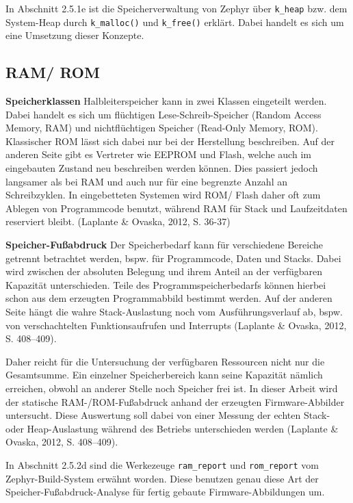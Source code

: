 In Abschnitt 2.5.1e ist die Speicherverwaltung von Zephyr {\"u}ber \lstinline[style=fileinline]|k_heap| bzw. dem System-Heap durch \lstinline[style=fileinline]|k_malloc()| und \lstinline[style=fileinline]|k_free()| erkl{\"a}rt. Dabei handelt es sich um eine Umsetzung dieser Konzepte.

\subsection{RAM/ ROM}
\textbf{Speicherklassen }Halbleiterspeicher kann in zwei Klassen eingeteilt werden. Dabei handelt es sich um fl{\"u}chtigen Lese-Schreib-Speicher (Random Access Memory, RAM) und nichtfl{\"u}chtigen Speicher (Read-Only Memory, ROM). Klassischer ROM l{\"a}sst sich dabei nur bei der Herstellung beschreiben. Auf der anderen Seite gibt es Vertreter wie EEPROM und Flash, welche auch im eingebauten Zustand neu beschreiben werden k{\"o}nnen. Dies passiert jedoch langsamer als bei RAM und auch nur f{\"u}r eine begrenzte Anzahl an Schreibzyklen. In eingebetteten Systemen wird ROM/ Flash daher oft zum Ablegen von Programmcode benutzt, w{\"a}hrend RAM f{\"u}r Stack und Laufzeitdaten reserviert bleibt. (Laplante \& Ovaska, 2012, S. 36-37)

\textbf{Speicher-Fu{\ss}abdruck }Der Speicherbedarf kann f{\"u}r verschiedene Bereiche getrennt betrachtet werden, bspw. f{\"u}r Programmcode, Daten und Stacks. Dabei wird zwischen der absoluten Belegung und ihrem Anteil an der verf{\"u}gbaren Kapazit{\"a}t unterschieden. Teile des Programmspeicherbedarfs k{\"o}nnen hierbei schon aus dem erzeugten Programmabbild bestimmt werden. Auf der anderen Seite h{\"a}ngt die wahre Stack-Auslastung noch vom Ausf{\"u}hrungsverlauf ab, bspw. von verschachtelten Funktionsaufrufen und Interrupts (Laplante \& Ovaska, 2012, S. 408--409).

Daher reicht f{\"u}r die Untersuchung der verf{\"u}gbaren Ressourcen nicht nur die Gesamtsumme. Ein einzelner Speicherbereich kann seine Kapazit{\"a}t n{\"a}mlich erreichen, obwohl an anderer Stelle noch Speicher frei ist. In dieser Arbeit wird der statische RAM-/ROM-Fu{\ss}abdruck anhand der erzeugten Firmware-Abbilder untersucht. Diese Auswertung soll dabei von einer Messung der echten Stack- oder Heap-Auslastung w{\"a}hrend des Betriebs unterschieden werden (Laplante \& Ovaska, 2012, S. 408--409).

In Abschnitt 2.5.2d sind die Werkezeuge \lstinline[style=fileinline]|ram_report| und \lstinline[style=fileinline]|rom_report| vom Zephyr-Build-System erw{\"a}hnt worden. Diese benutzen genau diese Art der Speicher-Fu{\ss}abdruck-Analyse f{\"u}r fertig gebaute Firmware-Abbildungen um.

